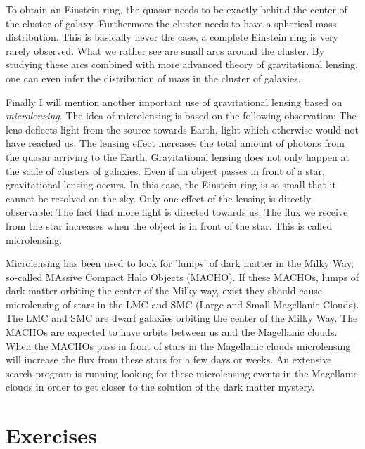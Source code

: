 {\begin{multicols}{2}
\begin{figure}
{{\begin{minipage}{0.35\textwidth}
\end{minipage}
}}
\end{figure}
To obtain an Einstein ring, the quasar needs to be exactly behind the center of the cluster of galaxy. Furthermore the cluster needs to have a spherical mass distribution. This is basically never the case, a complete Einstein ring is very rarely observed. What we rather see are small arcs around the cluster. By studying these arcs combined with more advanced theory of gravitational lensing, one can even infer the distribution of mass in the cluster of galaxies.

Finally I will mention another important use of gravitational lensing based on {\it microlensing}. The idea of microlensing is based on the following observation: The lens deflects light from the source towards Earth, light which otherwise would not have reached us. The lensing effect increases the total amount of photons from the quasar arriving to the Earth. Gravitational lensing does not only happen at the scale of clusters of galaxies. Even if an object passes in front of a star, gravitational lensing occurs. In this case, the Einstein ring is so small that it cannot be resolved on the sky. Only one effect of the lensing is directly observable: The fact that more light is directed towards us. The flux we receive from the star increases when the object is in front of the star. This is called microlensing. 

Microlensing has been used to look for 'lumps' of dark matter in the Milky Way, so-called MAssive Compact Halo Objects (MACHO). If these MACHOs, lumps of dark matter orbiting the center of the Milky way, exist they should cause microlensing of stars in the LMC and SMC (Large and Small Magellanic Clouds). The LMC and SMC are dwarf galaxies orbiting the center of the Milky Way. The MACHOs are expected to have orbits between us and the Magellanic clouds. When the MACHOs pass in front of stars in the Magellanic clouds microlensing will increase the flux from these stars for a few days or weeks. An extensive search program is running looking for these microlensing events in the Magellanic clouds in order to get closer to the solution of the dark matter mystery.

\newpage


\pagestyle{headings}
\section{Exercises}
\newcommand{\newproblem}[1]{\refstepcounter{problem}\label{#1}{\bf Exercise \refproblem{#1}}}


\end{multicols}}
